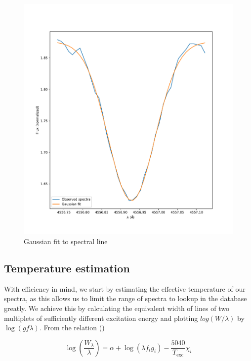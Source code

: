 \documentclass{aa}
\begin{document}
\begin{figure}
  \centering
  \includegraphics[width=\linewidth]{line_fit1.pdf}
  \caption{Gaussian fit to spectral line}
  \label{fig:line_fit}
\end{figure}


\subsection{Temperature estimation}
\label{sec:temp_estimation}

With efficiency in mind, we start by estimating the effective temperature of our
spectra, as this allows us to limit the range of spectra to lookup in the
database greatly. We achieve this by calculating the equivalent width of lines
of two multiplets of sufficiently different excitation energy and plotting
$log \left(  W / \lambda \right)$ by $\log \left( g f \lambda \right)$. From the
relation (\cite{monteiro_sebenta_2019}) 

\begin{equation}
  \label{eq:log_W_relation}
  \log \left( \frac{W_\lambda}{\lambda} \right) = \alpha  + \log \left( \lambda f_i g_i \right) - \frac{5040}{T_{\text{exc}}} \chi_i
\end{equation}
\end{document}
